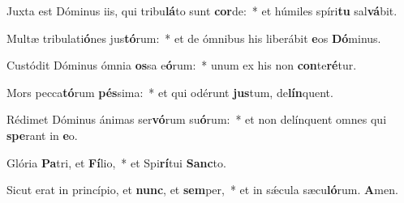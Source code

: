 \item Juxta est Dóminus iis, qui tribu\textbf{lá}to sunt \textbf{cor}de:~* et húmiles spíri\textbf{tu} sal\textbf{vá}bit.
\item Multæ tribulati\textbf{ó}nes jus\textbf{tó}\-rum:~* et de ómnibus his liberábit \textbf{e}os \textbf{Dó}minus.
\item Custódit Dóminus ómnia \textbf{os}sa e\textbf{ó}rum:~* unum ex his non \textbf{con}te\textbf{ré}tur.
\item Mors pecca\textbf{tó}rum \textbf{pés}sima:~* et qui odérunt \textbf{jus}tum, de\textbf{lín}quent.
\item Rédimet Dóminus ánimas ser\textbf{vó}rum su\textbf{ó}rum:~* et non delínquent omnes qui \textbf{spe}rant in \textbf{e}o.
\item Glória \textbf{Pa}tri, et \textbf{Fí}lio,~* et Spi\textbf{rí}tui \textbf{Sanc}to.
\item Sicut erat in princípio, et \textbf{nunc}, et \textbf{sem}per,~* et in sǽcula sæcu\textbf{ló}rum. \textbf{A}men.
